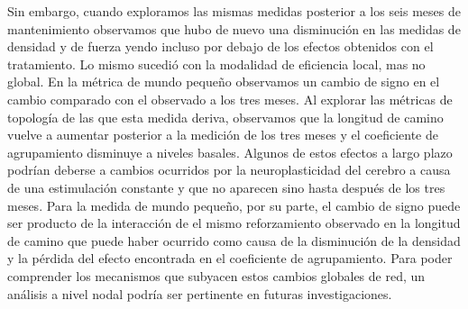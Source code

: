 Sin embargo, cuando exploramos las mismas medidas posterior a los seis meses de mantenimiento observamos que hubo de nuevo una disminución en las medidas de densidad y de fuerza yendo incluso por debajo de los efectos obtenidos con el tratamiento. Lo mismo sucedió con la modalidad de eficiencia local, mas no global. En la métrica de mundo pequeño observamos un cambio de signo en el cambio comparado con el observado a los tres meses. Al explorar las métricas de topología de las que esta medida deriva, observamos que la longitud de camino vuelve a aumentar posterior a la medición de los tres meses y el coeficiente de agrupamiento disminuye a niveles basales. Algunos de estos efectos a largo plazo podrían deberse a cambios ocurridos por la neuroplasticidad del cerebro a causa de una estimulación constante y que no aparecen sino hasta después de los tres meses. Para la medida de mundo pequeño, por su parte, el cambio de signo puede ser producto de la interacción de el mismo reforzamiento observado en la longitud de camino \textemdash{}que puede haber ocurrido como causa de la disminución de la densidad\textemdash{} y la pérdida del efecto encontrada en el coeficiente de agrupamiento. Para poder comprender los mecanismos que subyacen estos cambios globales de red, un análisis a nivel nodal podría ser pertinente en futuras investigaciones.

